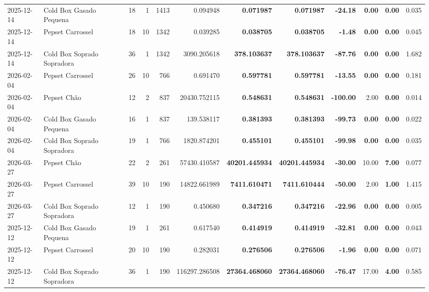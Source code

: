 {\begin{center}
{\begin{tabular}{@{}llrrrrrrrrrr@{}}
2025-12-14 & Cold Box Gasado Pequena & 18 & 1 & 1413 & 0.094948 & \textbf{0.071987} & \textbf{0.071987} & \textbf{-24.18} & \textbf{0.00} & \textbf{0.00} & 0.035 \\
2025-12-14 & Pepset Carrossel & 18 & 10 & 1342 & 0.039285 & \textbf{0.038705} & \textbf{0.038705} & \textbf{-1.48} & \textbf{0.00} & \textbf{0.00} & 0.045 \\
2025-12-14 & Cold Box Soprado Sopradora & 36 & 1 & 1342 & 3090.205618 & \textbf{378.103637} & \textbf{378.103637} & \textbf{-87.76} & \textbf{0.00} & \textbf{0.00} & 1.682 \\
2026-02-04 & Pepset Carrossel & 26 & 10 & 766 & 0.691470 & \textbf{0.597781} & \textbf{0.597781} & \textbf{-13.55} & \textbf{0.00} & \textbf{0.00} & 0.181 \\
2026-02-04 & Pepset Chão & 12 & 2 & 837 & 20430.752115 & \textbf{0.548631} & \textbf{0.548631} & \textbf{-100.00} & 2.00 & \textbf{0.00} & 0.014 \\
2026-02-04 & Cold Box Gasado Pequena & 16 & 1 & 837 & 139.538117 & \textbf{0.381393} & \textbf{0.381393} & \textbf{-99.73} & \textbf{0.00} & \textbf{0.00} & 0.022 \\
2026-02-04 & Cold Box Soprado Sopradora & 19 & 1 & 766 & 1820.874201 & \textbf{0.455101} & \textbf{0.455101} & \textbf{-99.98} & \textbf{0.00} & \textbf{0.00} & 0.035 \\
2026-03-27 & Pepset Chão & 22 & 2 & 261 & 57430.410587 & \textbf{40201.445934} & \textbf{40201.445934} & \textbf{-30.00} & 10.00 & \textbf{7.00} & 0.077 \\
2026-03-27 & Pepset Carrossel & 39 & 10 & 190 & 14822.661989 & \textbf{7411.610471} & \textbf{7411.610444} & \textbf{-50.00} & 2.00 & \textbf{1.00} & 1.415 \\
2026-03-27 & Cold Box Soprado Sopradora & 12 & 1 & 190 & 0.450680 & \textbf{0.347216} & \textbf{0.347216} & \textbf{-22.96} & \textbf{0.00} & \textbf{0.00} & 0.005 \\
2025-12-12 & Cold Box Gasado Pequena & 19 & 1 & 261 & 0.617540 & \textbf{0.414919} & \textbf{0.414919} & \textbf{-32.81} & \textbf{0.00} & \textbf{0.00} & 0.043 \\
2025-12-12 & Pepset Carrossel & 20 & 10 & 190 & 0.282031 & \textbf{0.276506} & \textbf{0.276506} & \textbf{-1.96} & \textbf{0.00} & \textbf{0.00} & 0.071 \\
2025-12-12 & Cold Box Soprado Sopradora & 36 & 1 & 190 & 116297.286508 & \textbf{27364.468060} & \textbf{27364.468060} & \textbf{-76.47} & 17.00 & \textbf{4.00} & 0.585 \\

\end{tabular}}
\end{center}}
